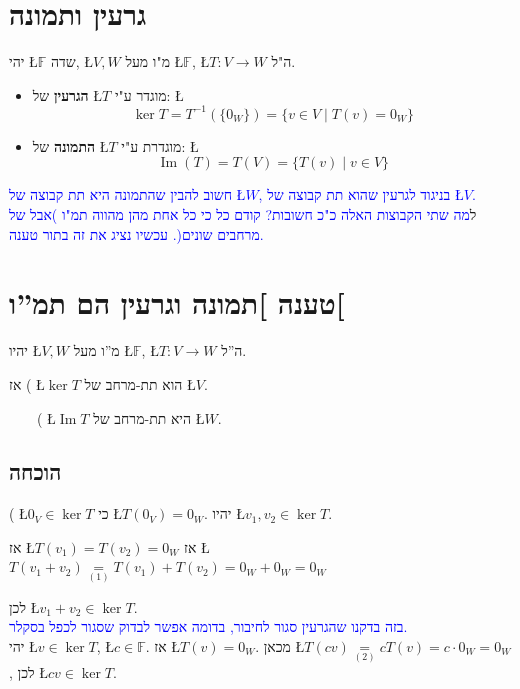 \documentclass[english,hebrew]{article}
\begin{document}
\section{גרעין ותמונה}

יהי \L{$\mathbb{F}$} שדה, \L{$V,W$} מ"ו מעל \L{$\mathbb{F}$},
\L{$T:V\to W$} ה"ל. 
\begin{itemize}
\item \textbf{הגרעין} של \L{$T$} מוגדר ע"י: \L{%
\[
\ker T=T^{-1}(\{0_{W}\})=\{v\in V\mid T(v)=0_{W}\}
\]
}%
\item \textbf{התמונה} של \L{$T$} מוגדרת ע"י: \L{%
\[
\operatorname{Im}(T)=T(V)=\{T(v)\mid v\in V\}
\]
}%
\end{itemize}
\textcolor{blue}{חשוב להבין שהתמונה היא תת קבוצה של \L{$W$}, בניגוד
לגרעין שהוא תת קבוצה של \L{$V$}.}\\

ל\textcolor{blue}{מה שתי הקבוצות האלה כ"כ חשובות? קודם כל כי כל אחת
מהן מהווה תמ"ו )אבל של מרחבים שונים(. עכשיו נציג את זה בתור טענה.}\\

\section{טענה {]}תמונה וגרעין הם תמ\textquotedblright ו{[}}

יהיו \L{$V,W$} מ\textquotedblright ו מעל \L{$\mathbb{F}$}, \L{$T:V\rightarrow W$}
ה\textquotedblright ל.

אז {\endL}( \L{$\ker T$} הוא תת-מרחב של \L{$V$}. 

\ \ \ \ {\endL}( \L{$\operatorname{Im}T$} היא תת-מרחב
של \L{$W$}.

\subsection{הוכחה}

{\endL}( \L{$0_{V}\in\ker T$} כי \L{$T(0_{V})=0_{W}$}.
יהיו \L{$v_{1},v_{2}\in\ker T$}.

אז \L{$T(v_{1})=T(v_{2})=0_{W}$} אז \L{$T(v_{1}+v_{2})\underset{(\text{1})}{=}T(v_{1})+T(v_{2})=0_{W}+0_{W}=0_{W}$}

לכן \L{$v_{1}+v_{2}\in\ker T$}. \\

\textcolor{blue}{בזה בדקנו שהגרעין סגור לחיבור, בדומה אפשר לבדוק שסגור
לכפל בסקלר.}\\
 

יהי \L{$v\in\ker T$}, \L{$c\in\mathbb{F}$}. אז \L{$T(v)=0_{W}$}.
מכאן \L{$T(cv)\underset{(2)}{=}cT(v)=c\cdot0_{W}=0_{W}$}, לכן \L{$cv\in\ker T$}.
\\
\end{document}
